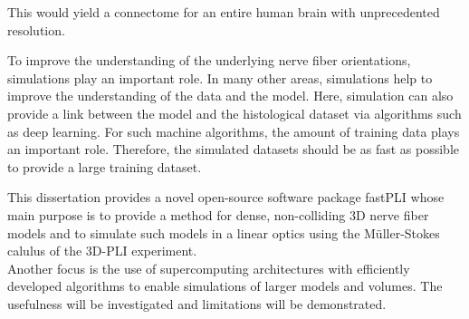This would yield a connectome for an entire human brain with unprecedented resolution. \cite{Axer2011a, Axer2011, Axer2016}
\par
% 
To improve the understanding of the underlying nerve fiber orientations, simulations play an important role.
In many other areas, simulations help to improve the understanding of the data and the model.
Here, simulation can also provide a link between the model and the histological dataset via algorithms such as deep learning.
For such machine algorithms, the amount of training data plays an important role.
Therefore, the simulated datasets should be as fast as possible to provide a large training dataset.
\cite{Ginsburger2018, ginsburgerDis2019, Callaghan2019, Menzel2020}
\par
%
This dissertation provides a novel open-source software package \ac{fastPLI} whose main purpose is to provide a method for dense, non-colliding 3D nerve fiber models and to simulate such models in a linear optics using the M\"{u}ller-Stokes calulus of the \ac{3D-PLI} experiment. \cite{Matuschke2019, Matuschke2021, Reuter2019}\\
Another focus is the use of supercomputing architectures with efficiently developed algorithms to enable simulations of larger models and volumes.
The usefulness will be investigated and limitations will be demonstrated.
